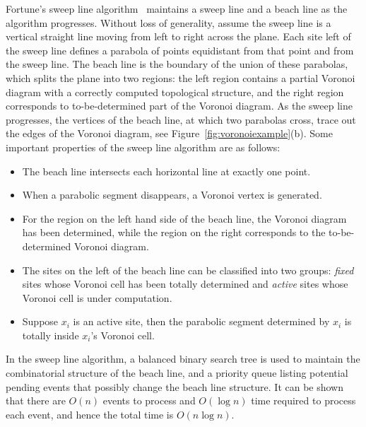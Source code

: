Fortune's sweep line algorithm~\cite{Fortune1986} maintains a sweep
line and a beach line as the algorithm progresses. Without loss of
generality, assume the sweep line is a vertical straight line moving
from left to right across the plane. Each site left of the sweep
line defines a parabola of points equidistant from that point and
from the sweep line. The beach line is the boundary of the union of
these parabolas, which splits the plane into two regions: the left
region contains a partial Voronoi diagram with a correctly computed
topological structure, and the right region corresponds to
to-be-determined part of the Voronoi diagram. As the sweep line
progresses, the vertices of the beach line, at which two parabolas
cross, trace out the edges of the Voronoi diagram, see
Figure~\ref{fig:voronoiexample}(b). Some important properties of the
sweep line algorithm are as follows:
\begin{itemize}
\item The beach line intersects each horizontal line at exactly one point.
\item When a parabolic segment disappears,  a Voronoi vertex is generated.
\item For the region on the left hand side of the beach line, the Voronoi diagram has been determined, while the region on the right corresponds to the to-be-determined Voronoi
diagram.
\item The sites on the left of the beach line can be classified into two
groups: {\em fixed} sites whose Voronoi cell has been totally
determined and {\em active} sites whose Voronoi cell is under
computation.
\item Suppose $x_i$ is an active site, then the parabolic segment determined by $x_i$ is totally inside $x_i$'s Voronoi cell.
\end{itemize}


In the sweep line algorithm, a balanced binary search tree is used to
maintain the combinatorial structure of the beach line, and a
priority queue listing potential pending events that possibly change the
beach line structure. It can be shown that there are $O(n)$ events
to process and $O(\log n)$ time required to process each event, and hence the total
time is $O(n\log n)$.



